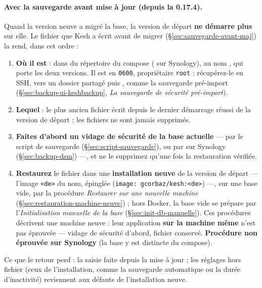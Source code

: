 \documentclass[a4paper,11pt,oneside]{article}
\begin{document}
\paragraph{Avec la sauvegarde avant mise à jour (depuis la 0.17.4).} Quand la version neuve a migré la base, la version de départ \textbf{ne démarre plus} sur elle. Le fichier que Kesh a écrit avant de migrer (\S\ref{sec:sauvegarde-avant-maj}) la rend, dans cet ordre :
\begin{enumerate}
    \item \textbf{Où il est} : dans  du répertoire du compose ( sur Synology), au nom , qui porte les deux versions. Il est en \texttt{0600}, propriétaire \texttt{root} : récupérez-le en SSH,  vers un dossier partagé puis , comme la sauvegarde pré-import (\S\ref{sec:backup-ui-keshbackup}, \emph{La sauvegarde de sécurité pré-import}).
    \item \textbf{Lequel} : le plus ancien fichier écrit depuis le dernier démarrage réussi de la version de départ ; les fichiers ne sont jamais supprimés.
    \item \textbf{Faites d'abord un vidage de sécurité de la base actuelle} --- par le script de sauvegarde (\S\ref{sec:script-sauvegarde}), ou par  sur Synology (\S\ref{sec:backup-dsm}) ---, et ne le supprimez qu'une fois la restauration vérifiée.
    \item \textbf{Restaurez} le fichier dans une \textbf{installation neuve} de la version de départ --- l'image \texttt{<de>} du nom, épinglée (\texttt{image: gcorbaz/kesh:<de>}) ---, sur une base vide, par la procédure \emph{Restaurer sur une nouvelle machine} (\S\ref{sec:restauration-machine-neuve}) ; hors Docker, la base vide se prépare par l'\emph{Initialisation manuelle de la base} (\S\ref{sec:init-db-manuelle}). Ces procédures décrivent une machine neuve : leur application \textbf{sur la machine même} n'est pas éprouvée --- vidage de sécurité d'abord, fichier  conservé. \textbf{Procédure non éprouvée sur Synology} (la base y est distincte du compose).
\end{enumerate}
Ce que le retour perd : la saisie faite depuis la mise à jour ; les réglages hors fichier (ceux de l'installation, comme la sauvegarde automatique ou la durée d'inactivité) reviennent aux défauts de l'installation neuve.
\end{document}

